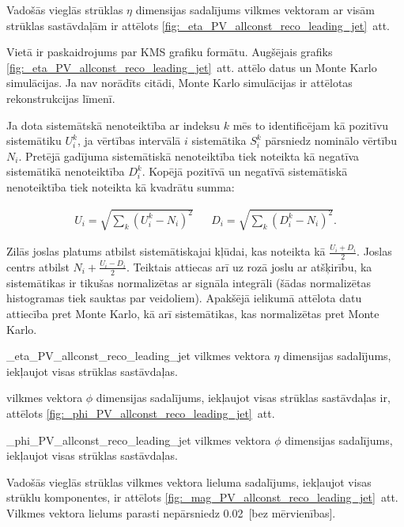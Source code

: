 Vadošās vieglās strūklas \leadingjet $\eta$ dimensijas sadalījums vilkmes vektoram ar visām strūklas sastāvdaļām ir attēlots \ref{fig:_eta_PV_allconst_reco_leading_jet}~att.

Vietā ir paskaidrojums par KMS grafiku formātu. Augšējais grafiks \ref{fig:_eta_PV_allconst_reco_leading_jet}~att. attēlo datus un Monte Karlo simulācijas. Ja nav norādīts citādi, Monte Karlo simulācijas ir attēlotas rekonstrukcijas līmenī.

Ja dota sistemātskā nenoteiktība ar indeksu $k$ mēs to identificējam kā pozitīvu sistemātiku $U^{k}_{i}$, ja vērtības intervālā $i$ sistemātika $S^{k}_i$ pārsniedz nominālo vērtību $N_{i}$. Pretējā gadījuma sistemātiskā nenoteiktība tiek noteikta kā negatīva sistemātikā nenoteiktība $D^{k}_{i}$. Kopējā pozitīvā un negatīvā sistemātiskā nenoteiktība tiek noteikta kā kvadrātu summa:

\begin{align}
U_{i}=\sqrt{\sum_{k}\left(U^{k}_{i}-N_{i}\right)^{2}} && D_{i}=\sqrt{\sum_{k}\left(D^{k}_{i}-N_{i}\right)^{2}}.
\end{align}

Zilās joslas platums atbilst sistemātiskajai kļūdai, kas noteikta kā $\frac{U_{i}+D_{i}}{2}$. Joslas centrs atbilst $N_{i}+\frac{U_{i}-D_{i}}{2}$. Teiktais attiecas arī uz rozā joslu ar atšķirību, ka sistemātikas ir tikušas normalizētas ar signāla integrāli (šādas normalizētas histogramas tiek sauktas par \gls{veidoliem}). Apakšējā ielikumā attēlota datu attiecība pret Monte Karlo, kā arī sistemātikas, kas normalizētas pret Monte Karlo.

          {_eta_PV_allconst_reco_leading_jet}
          {\leadingjet vilkmes vektora $\eta$ dimensijas sadalījums, iekļaujot visas strūklas sastāvdaļas.}

\leadingjet vilkmes vektora $\phi$ dimensijas sadalījums, iekļaujot visas strūklas sastāvdaļas ir, attēlots \ref{fig:_phi_PV_allconst_reco_leading_jet}~att. 

          {_phi_PV_allconst_reco_leading_jet}
          {\leadingjet vilkmes vektora $\phi$ dimensijas sadalījums, iekļaujot visas strūklas sastāvdaļas.}

Vadošās vieglās strūklas vilkmes vektora lieluma sadalījums, iekļaujot visas strūklu komponentes, ir attēlots \ref{fig:_mag_PV_allconst_reco_leading_jet}~att. Vilkmes vektora lielums parasti nepārsniedz 0.02~[bez mērvienības].

